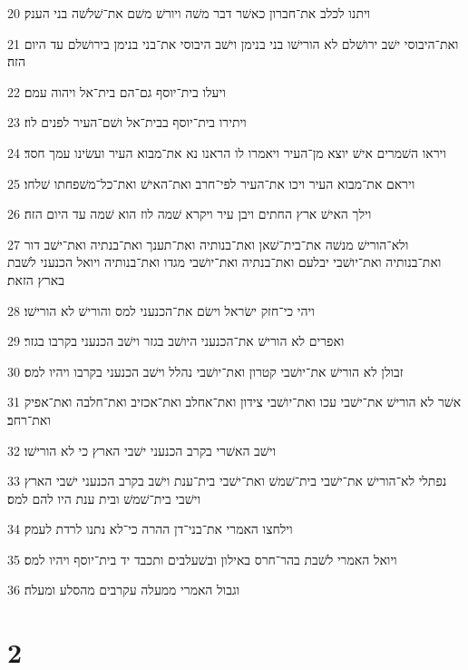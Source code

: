 \par 20 ויתנו לכלב את־חברון כאשׁר דבר משׁה ויורשׁ משׁם את־שׁלשׁה בני הענק׃
\par 21 ואת־היבוסי ישׁב ירושׁלם לא הורישׁו בני בנימן וישׁב היבוסי את־בני בנימן בירושׁלם עד היום הזה׃
\par 22 ויעלו בית־יוסף גם־הם בית־אל ויהוה עמם׃
\par 23 ויתירו בית־יוסף בבית־אל ושׁם־העיר לפנים לוז׃
\par 24 ויראו השׁמרים אישׁ יוצא מן־העיר ויאמרו לו הראנו נא את־מבוא העיר ועשׂינו עמך חסד׃
\par 25 ויראם את־מבוא העיר ויכו את־העיר לפי־חרב ואת־האישׁ ואת־כל־משׁפחתו שׁלחו׃
\par 26 וילך האישׁ ארץ החתים ויבן עיר ויקרא שׁמה לוז הוא שׁמה עד היום הזה׃
\par 27 ולא־הורישׁ מנשׁה את־בית־שׁאן ואת־בנותיה ואת־תענך ואת־בנתיה ואת־ישׁב דור ואת־בנותיה ואת־יושׁבי יבלעם ואת־בנתיה ואת־יושׁבי מגדו ואת־בנותיה ויואל הכנעני לשׁבת בארץ הזאת׃
\par 28 ויהי כי־חזק ישׂראל וישׂם את־הכנעני למס והורישׁ לא הורישׁו׃
\par 29 ואפרים לא הורישׁ את־הכנעני היושׁב בגזר וישׁב הכנעני בקרבו בגזר׃
\par 30 זבולן לא הורישׁ את־יושׁבי קטרון ואת־יושׁבי נהלל וישׁב הכנעני בקרבו ויהיו למס׃
\par 31 אשׁר לא הורישׁ את־ישׁבי עכו ואת־יושׁבי צידון ואת־אחלב ואת־אכזיב ואת־חלבה ואת־אפיק ואת־רחב׃
\par 32 וישׁב האשׁרי בקרב הכנעני ישׁבי הארץ כי לא הורישׁו׃
\par 33 נפתלי לא־הורישׁ את־ישׁבי בית־שׁמשׁ ואת־ישׁבי בית־ענת וישׁב בקרב הכנעני ישׁבי הארץ וישׁבי בית־שׁמשׁ ובית ענת היו להם למס׃
\par 34 וילחצו האמרי את־בני־דן ההרה כי־לא נתנו לרדת לעמק׃
\par 35 ויואל האמרי לשׁבת בהר־חרס באילון ובשׁעלבים ותכבד יד בית־יוסף ויהיו למס׃
\par 36 וגבול האמרי ממעלה עקרבים מהסלע ומעלה׃

\chapter{2}


